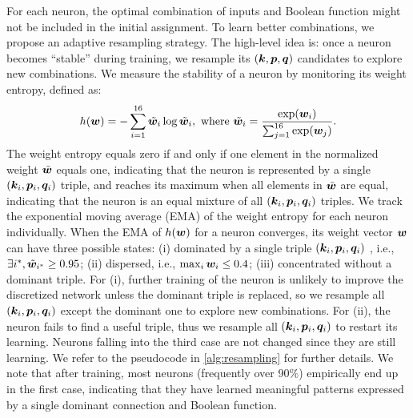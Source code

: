 For each neuron, the optimal combination of inputs and Boolean function might not be included
in the initial assignment. To learn better combinations, we propose an adaptive 
resampling strategy.
The high-level idea is: once a neuron becomes ``stable'' during training, 
we resample its $({\bm{k}}, {\bm{p}}, {\bm{q}})$ candidates to explore new combinations.
We measure the stability of a neuron by monitoring 
its  weight entropy, defined as:
\begin{equation*}
  h({\bm{w}}) = - \sum_{i=1}^{16} \tilde{{\bm{w}}}_i \log \tilde{{\bm{w}}}_i, \text{ where } \tilde{{\bm{w}}}_i = \frac{\exp({\bm{w}}_i)}{\sum_{j=1}^{16} \exp({\bm{w}}_j)}.
\end{equation*}
The weight entropy equals zero if and only if one element in the normalized weight $\tilde{{\bm{w}}}$ equals one, indicating that the neuron is represented by a single $({\bm{k}}_i, {\bm{p}}_i, {\bm{q}}_i)$ triple, and reaches its maximum when all elements in $\tilde{{\bm{w}}}$ are equal, indicating that the neuron is an equal mixture of all $({\bm{k}}_i, {\bm{p}}_i, {\bm{q}}_i)$ triples.
We track the exponential moving average (EMA) of the weight entropy 
for each neuron individually.
 When the EMA of $h({\bm{w}})$ for a neuron 
 converges, its weight vector ${\bm{w}}$ can have three possible states:
(i) dominated by a single triple $({\bm{k}}_i, {\bm{p}}_i, {\bm{q}}_i)$ , i.e., $\exists i^*, \tilde{{\bm{w}}}_{i^*} \ge 0.95$;
(ii) dispersed, i.e., $\max_i {\bm{w}}_i \le 0.4$;
(iii) concentrated without a dominant triple. 
For (i), further training of the neuron is unlikely to improve the discretized network unless the dominant triple is replaced, so we resample all $({\bm{k}}_i, {\bm{p}}_i, {\bm{q}}_i)$ except the dominant one to explore new combinations.
For (ii), the neuron fails to find a useful triple, thus we resample all $({\bm{k}}_i, {\bm{p}}_i, {\bm{q}}_i)$ to restart its learning. Neurons falling into the third case are not changed since they are still learning. 
We refer to the  pseudocode in \cref{alg:resampling} for further details.
We note that after training, most neurons (frequently over 90\%)
 empirically end up in the first case, indicating that they have learned meaningful patterns expressed by a single dominant connection and Boolean function.

